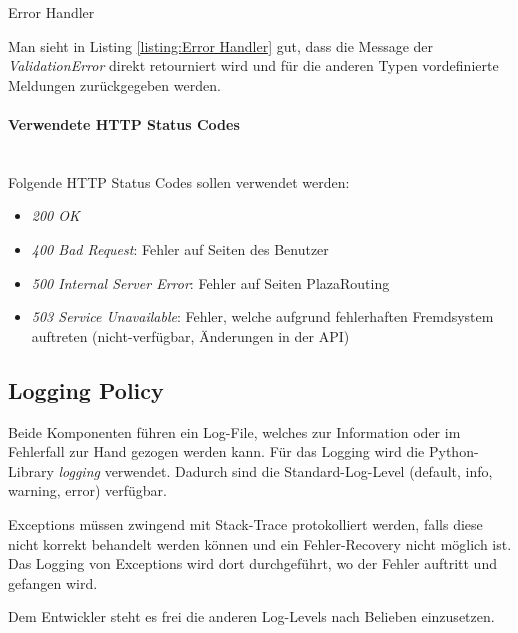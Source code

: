 \begin{listing}[ht]
    \inputminted{python}{projectdoc/listing/flask_error_handler.py}
    \caption{Error Handler}
    \label{listing:Error Handler}
\end{listing}

Man sieht in Listing \ref{listing:Error Handler} gut, dass die Message der \emph{ValidationError} direkt retourniert wird und für die anderen Typen vordefinierte Meldungen zurückgegeben werden.


\paragraph{Verwendete HTTP Status Codes}\label{ehp:Verwendete HTTP Status Codes}~\\
Folgende HTTP Status Codes sollen verwendet werden:
\begin{itemize}
    \item \emph{200 OK}
    \item \emph{400 Bad Request}: Fehler auf Seiten des Benutzer
    \item \emph{500 Internal Server Error}: Fehler auf Seiten PlazaRouting
    \item \emph{503 Service Unavailable}: Fehler, welche aufgrund fehlerhaften Fremdsystem auftreten (nicht-verfügbar, Änderungen in der API)
\end{itemize}


\subsection{Logging Policy}
\label{ehp:Logging Policy}
Beide Komponenten führen ein Log-File, welches zur Information oder im Fehlerfall zur Hand gezogen werden kann. Für das Logging wird die Python-Library \emph{logging} verwendet. Dadurch sind die Standard-Log-Level (default, info, warning, error) verfügbar.

Exceptions müssen zwingend mit Stack-Trace protokolliert werden, falls diese nicht korrekt behandelt werden können und ein Fehler-Recovery nicht möglich ist. Das Logging von Exceptions wird dort durchgeführt, wo der Fehler auftritt und gefangen wird.

Dem Entwickler steht es frei die anderen Log-Levels nach Belieben einzusetzen.
